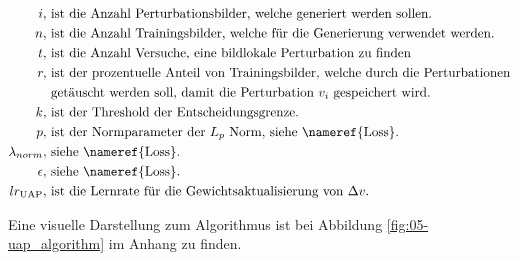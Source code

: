 \begin{align*}
i, &\text{ ist die Anzahl Perturbationsbilder, welche generiert werden sollen.} \\
n, &\text{ ist die Anzahl Trainingsbilder, welche für die Generierung verwendet werden.} \\
t, &\text{ ist die Anzahl Versuche, eine bildlokale Perturbation zu finden}\\
r, &\text{ ist der prozentuelle Anteil von Trainingsbilder, welche durch die Perturbationen} \\ 
&\text{  getäuscht werden soll, damit die Perturbation } v_i \text{ gespeichert wird.} \\
k, &\text{ ist der Threshold der Entscheidungsgrenze.} \\
p, &\text{ ist der Normparameter der $L_p$ Norm, siehe \nameref{Loss}.}\\
\lambda_{norm}, &\text{ siehe \nameref{Loss}.}\\
\epsilon, &\text{ siehe \nameref{Loss}.}\\
lr_{\text{UAP}}, &\text{ ist die Lernrate für die Gewichtsaktualisierung von $\Delta v$.}
\end{align*}

Eine visuelle Darstellung zum Algorithmus ist bei Abbildung \ref{fig:05-uap_algorithm} im Anhang zu finden. 



